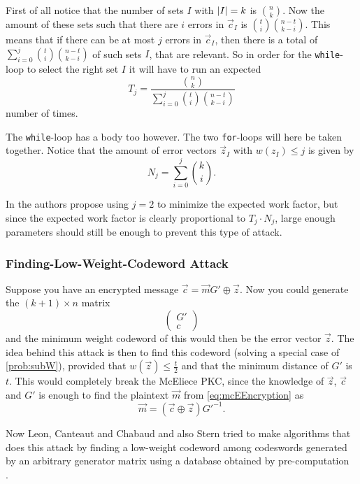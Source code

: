 First of all notice that the number of sets $I$ with $\left\vert I \right\vert = k$ is $\binom{n}{k}$. Now the amount of these sets such that there are $i$ errors in $\vec{c}_I$ is $\binom{t}{i}\binom{n-t}{k-i}$. This means that if there can be at most $j$ errors in $\vec{c}_I$, then there is a total of $\sum_{i=0}^j \binom{t}{i}\binom{n-t}{k-i}$ of such sets $I$, that are relevant. So in order for the \texttt{while}-loop to select the right set $I$ it will have to run an expected
\[
	T_j = \frac{\binom{n}{k}}{\sum_{i=0}^j \binom{t}{i} \binom{n-t}{k-i}}
\]
number of times.

The \texttt{while}-loop has a body too however. The two \texttt{for}-loops will here be taken together. Notice that the amount of error vectors $\vec{z}_I$ with $w\left(z_I\right) \leq j$ is given by
\[
	N_j = \sum\limits_{i=0}^j \binom{k}{i}.
\]

In \cite{LB} the authors propose using $j=2$ to minimize the expected work factor, but since the expected work factor is clearly proportional to $T_j \cdot N_j$, large enough parameters should still be enough to prevent this type of attack.



\subsubsection{Finding-Low-Weight-Codeword Attack}
\label{subsubsec:findLowWeiCodAtt}

Suppose you have an encrypted message $\vec{c} = \vec{m}G' \oplus \vec{z}$. Now you could generate the $\left(k+1\right) \times n$ matrix
\[
	\begin{pmatrix}
		G'\\
		c
	\end{pmatrix}
\]
and the minimum weight codeword of this would then be the error vector $\vec{z}$. The idea behind this attack is then to find this codeword (solving a special case of \cref{prob:subW}), provided that $w\left(\vec{z}\right) \leq \frac{t}{2}$ and that the minimum distance of $G'$ is $t$. This would completely break the McEliece PKC, since the knowledge of $\vec{z}$, $\vec{c}$ and $G'$ is enough to find the plaintext $\vec{m}$ from \cref{eq:mcEEncryption} as
\[
	\vec{m} = \left(\vec{c} \oplus \vec{z}\right) {G'}^{-1}.
\]

Now Leon, Canteaut and Chabaud and also Stern tried to make algorithms that does this attack by finding a low-weight codeword among codeswords generated by an arbitrary generator matrix using a database obtained by pre-computation\\
\cite{leon,CC2,stern}.


